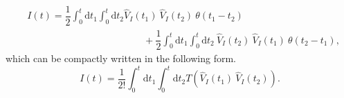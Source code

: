 \documentclass[
12pt, %
english, %
singlespacing, %
headsepline, %
]{MastersDoctoralThesis} %
\begin{document}
\begin{equation*}
\begin{split}
&I(t)=\dfrac{1}{2}
\int_{0}^{t}\mathrm{d}t_1\int_{0}^{t}\! \! \mathrm{d}t_2
\hat{V}_{I}(t_1)\ \hat{V}_{I}(t_2)\ \theta (t_1 -t_2)
\\
&\qquad\qquad\qquad\qquad\qquad\qquad
+
\dfrac{1}{2}
\int_{0}^{t}\mathrm{d}t_1\int_{0}^{t}\! \! \mathrm{d}t_2
\ \hat{V}_{I}(t_2)\  \hat{V}_{I}(t_1) \ \theta (t_2-t_1)
,
\end{split}
\end{equation*}
which can be compactly written in the following form.
\begin{equation}
I(t)=\dfrac{1}{2!}
\int_{0}^{t}\mathrm{d}t_1\int_{0}^{t}\! \! \mathrm{d}t_2
T(\hat{V}_{I}(t_1)\ \hat{V}_{I}(t_2))
.
\end{equation}
\end{document}
